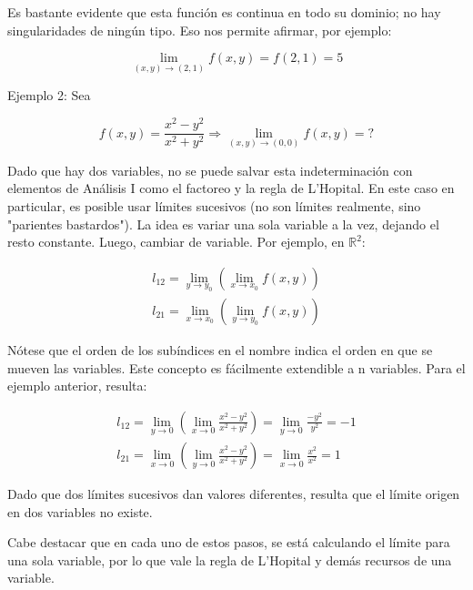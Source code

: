 \documentclass{article}
\renewcommand{\Bbb}{\mathbb}
\begin{document}
Es bastante evidente que esta función es continua en todo su dominio; no hay singularidades de ningún tipo. Eso nos permite afirmar, por ejemplo:

\begin{equation}
\lim_{(x,y) \rightarrow (2,1)} f(x,y) = f(2,1) = 5
\end{equation}

Ejemplo 2: Sea

\begin{equation}
f(x,y) = \frac{x^2 - y^2}{x^2 + y^2} \Rightarrow \lim_{(x,y) \rightarrow (0,0)} f(x,y) = ?
\end{equation}

Dado que hay dos variables, no se puede salvar esta indeterminación con elementos de Análisis I como el factoreo y la regla de L'Hopital. En este caso en particular, es posible usar límites sucesivos (no son límites realmente, sino "parientes bastardos"). La idea es variar una sola variable a la vez, dejando el resto constante. Luego, cambiar de variable. Por ejemplo, en $\Bbb R^2$:

\begin{subequations}
\begin{align}
l_{12} = \lim_{y \rightarrow y_0} \left( \lim_{x \rightarrow x_0} f(x,y) \right) \\
l_{21} = \lim_{x \rightarrow x_0} \left( \lim_{y \rightarrow y_0} f(x,y) \right)
\end{align}
\end{subequations}

Nótese que el orden de los subíndices en el nombre indica el orden en que se mueven las variables. Este concepto es fácilmente extendible a n variables. Para el ejemplo anterior, resulta:

\begin{subequations}
\begin{align}
l_{12} = \lim_{y \rightarrow 0} \left( \lim_{x \rightarrow 0} \frac{x^2-y^2}{x^2 + y^2} \right) = \lim_{y \rightarrow 0} \frac{-y^2}{y^2} = -1 \\
l_{21} = \lim_{x \rightarrow 0} \left( \lim_{y \rightarrow 0} \frac{x^2-y^2}{x^2 + y^2} \right) = \lim_{x \rightarrow 0} \frac{x^2}{x^2} = 1
\end{align}
\end{subequations}

Dado que dos límites sucesivos dan valores diferentes, resulta que el límite origen en dos variables no existe.

Cabe destacar que en cada uno de estos pasos, se está calculando el límite para una sola variable, por lo que vale la regla de L'Hopital y demás recursos de una variable.
\end{document}
